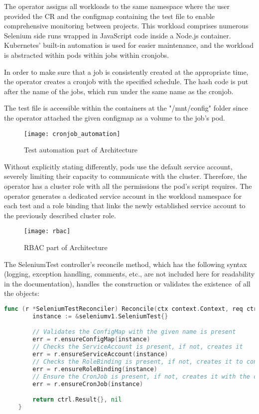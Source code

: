 The operator assigns all workloads to the same namespace where the user provided the CR and the configmap containing the test file to enable comprehensive monitoring between projects. This workload comprises numerous Selenium side runs wrapped in JavaScript code inside a Node.js container. Kubernetes' built-in automation is used for easier maintenance, and the workload is abstracted within pods within jobs within cronjobs.

In order to make sure that a job is consistently created at the appropriate time, the operator creates a cronjob with the specified schedule. The hash code is put after the name of the jobs, which run under the same name as the cronjob.

The test file is accessible within the containers at the "/mnt/config" folder since the operator attached the given configmap as a volume to the job's pod.

\begin{figure}[H]
	\centering
	\texttt{[image: cronjob\_automation]}
	\label{fig:cronjob_automation}
	\caption{Test automation part of Architecture}
\end{figure}

Without explicitly stating differently, pods use the default service account, severely limiting their capacity to communicate with the cluster. Therefore, the operator has a cluster role with all the permissions the pod's script requires. The operator generates a dedicated service account in the workload namespace for each test and a role binding that links the newly established service account to the previously described cluster role.

\begin{figure}[H]
	\centering
	\texttt{[image: rbac]}
	\label{fig:rbac}
	\caption{RBAC part of Architecture}
\end{figure}

The SeleniumTest controller's reconcile method, which has the following syntax (logging, exception handling, comments, etc., are not included here for readability in the documentation), handles the construction or validates the existence of all the objects:
\begin{lstlisting}[language={Go}]
	func (r *SeleniumTestReconciler) Reconcile(ctx context.Context, req ctrl.Request) (ctrl.Result, error) {
		instance := &seleniumv1.SeleniumTest{}

		// Validates the ConfigMap with the given name is present
		err = r.ensureConfigMap(instance)
		// Checks the ServiceAccount is present, if not, creates it
		err = r.ensureServiceAccount(instance)
		// Checks the RoleBinding is present, if not, creates it to connect the service account to the cluster role
		err = r.ensureRoleBinding(instance)
		// Ensure the CronJob is present, if not, creates it with the configmap attached as volume, with the serviceaccount above 
		err = r.ensureCronJob(instance)

		return ctrl.Result{}, nil
	}	
\end{lstlisting}

